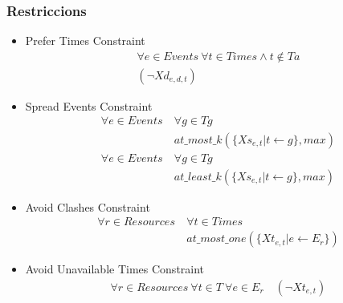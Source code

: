 \documentclass[11pt]{beamer}
\begin{document}
  \begin{frame}
    \frametitle{Restriccions}

    \begin{itemize}

      \item Prefer Times Constraint
      \begin{gather*}
        \forall e \in Events \ \forall t \in Times \land t \notin Ta \\ (\neg Xd_{e,d,t})
      \end{gather*}
      \item Spread Events Constraint
        \begin{align*}
          \forall e \in Events \ &\forall g \in Tg \\
          &at\_most\_k(\{Xs_{e,t} | t \leftarrow g\}, max)\\
          \forall e \in Events \ &\forall g \in Tg \\
          &at\_least\_k(\{Xs_{e,t} | t \leftarrow g\}, max)
        \end{align*}    
      \item Avoid Clashes Constraint
        \begin{align*}
          \forall r \in Resources \ & \forall t \in Times \\
          &at\_most\_one(\{Xt_{e,t} | e \leftarrow E_r\})
        \end{align*}

        \item Avoid Unavailable Times Constraint
        \begin{align*}
          \forall r \in Resources \ \forall t \in T \ \forall e \in E_r \quad
          (\neg Xt_{e,t})
        \end{align*}
    
    \end{itemize}
  
  \end{frame}
\end{document}
